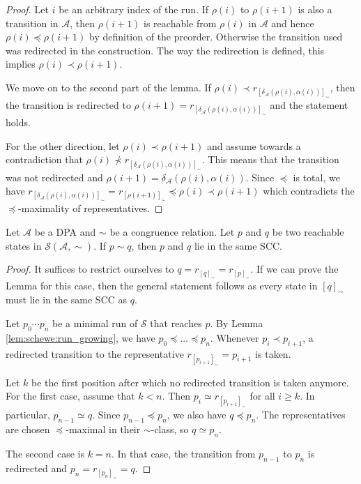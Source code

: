 \begin{proof}
	Let $i$ be an arbitrary index of the run. If $\rho(i)$ to $\rho(i+1)$ is also a transition in $\mathcal{A}$, then $\rho(i+1)$ is reachable from $\rho(i)$ in $\mathcal{A}$ and hence $\rho(i) \preceq \rho(i+1)$ by definition of the preorder. Otherwise the transition used was redirected in the construction. The way the redirection is defined, this implies $\rho(i) \prec \rho(i+1)$.
	
	We move on to the second part of the lemma. If $\rho(i) \prec r_{[\delta_\mathcal{A}(\rho(i), \alpha(i))]_\sim}$, then the transition is redirected to $\rho(i+1) = r_{[\delta_\mathcal{A}(\rho(i), \alpha(i))]_\sim}$ and the statement holds. 
	
	For the other direction, let $\rho(i) \prec \rho(i+1)$ and assume towards a contradiction that $\rho(i) \not\prec r_{[\delta_\mathcal{A}(\rho(i), \alpha(i))]_\sim}$. This means that the transition was not redirected and $\rho(i+1) = \delta_\mathcal{A}(\rho(i), \alpha(i))$. Since $\preceq$ is total, we have $r_{[\delta_\mathcal{A}(\rho(i), \alpha(i))]_\sim} = r_{[\rho(i+1)]_\sim} \preceq \rho(i) \prec \rho(i+1)$ which contradicts the $\preceq$-maximality of representatives.
\end{proof}

\begin{lem}
\label{lem:schewe:equiv_same_scc}
	Let $\mathcal{A}$ be a DPA and $\sim$ be a congruence relation. Let $p$ and $q$ be two reachable states in $\mathcal{S}(\mathcal{A}, \sim)$. If $p \sim q$, then $p$ and $q$ lie in the same SCC. 
\end{lem}

\begin{proof}
	It suffices to restrict ourselves to $q = r_{[q]_\sim} = r_{[p]_\sim}$. If we can prove the Lemma for this case, then the general statement follows as every state in $[q]_\sim$ must lie in the same SCC as $q$.
	
	Let $p_0 \cdots p_n$ be a minimal run of $\mathcal{S}$ that reaches $p$. By Lemma \ref{lem:schewe:run_growing}, we have $p_0 \preceq \dots \preceq p_n$. Whenever $p_i \prec p_{i+1}$, a redirected transition to the representative $r_{[p_{i+1}]_\sim} = p_{i+1}$ is taken. 
	
	Let $k$ be the first position after which no redirected transition is taken anymore. For the first case, assume that $k < n$. Then $p_i \simeq r_{[p_{i+1}]_\sim}$ for all $i \geq k$. In particular, $p_{n-1} \simeq q$. Since $p_{n-1} \preceq p_n$, we also have $q \preceq p_n$. The representatives are chosen $\preceq$-maximal in their $\sim$-class, so $q \simeq p_n$.
	
	The second case is $k = n$. In that case, the transition from $p_{n-1}$ to $p_n$ is redirected and $p_n = r_{[p_n]_\sim} = q$.
\end{proof}


